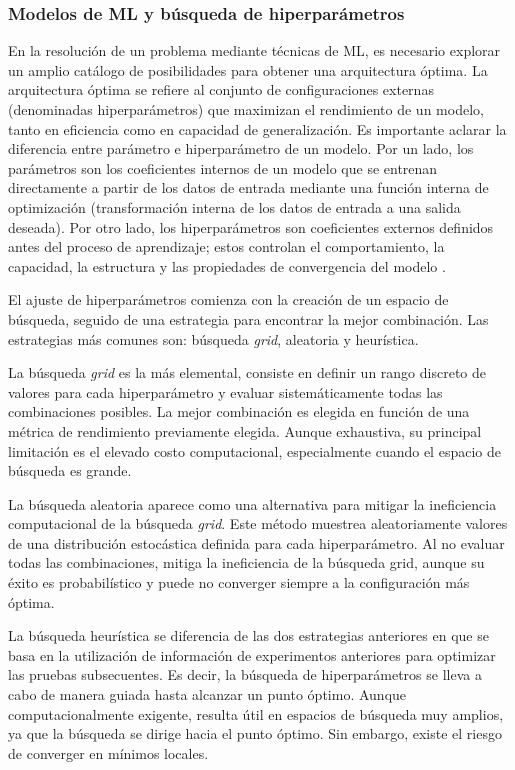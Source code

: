 \subsubsection{Modelos de ML y búsqueda de hiperparámetros}

En la resolución de un problema mediante técnicas de ML, es necesario explorar un amplio catálogo de posibilidades para obtener una arquitectura óptima. La arquitectura óptima se refiere al conjunto de configuraciones externas (denominadas hiperparámetros) que maximizan el rendimiento de un modelo, tanto en eficiencia como en capacidad de generalización. Es importante aclarar la diferencia entre parámetro e hiperparámetro de un modelo. Por un lado, los parámetros son los coeficientes internos de un modelo que se entrenan directamente a partir de los datos de entrada mediante una función interna de optimización (transformación interna de los datos de entrada a una salida deseada). Por otro lado, los hiperparámetros son coeficientes externos definidos antes del proceso de aprendizaje; estos controlan el comportamiento, la capacidad, la estructura y las propiedades de convergencia del modelo \cite{feurer2019hyperparameter}.

El ajuste de hiperparámetros comienza con la creación de un espacio de búsqueda, seguido de una estrategia para encontrar la mejor combinación. Las estrategias más comunes son: búsqueda \textit{grid}, aleatoria y heurística.


La búsqueda \textit{grid} es la más elemental, consiste en definir un rango discreto de valores para cada hiperparámetro y evaluar sistemáticamente todas las combinaciones posibles. La mejor combinación es elegida en función de una métrica de rendimiento previamente elegida. Aunque exhaustiva, su principal limitación es el elevado costo computacional, especialmente cuando el espacio de búsqueda es grande.

La búsqueda aleatoria aparece como una alternativa para mitigar la ineficiencia computacional de la búsqueda \textit{grid}. Este método muestrea aleatoriamente valores de una distribución estocástica definida para cada hiperparámetro. Al no evaluar todas las combinaciones, mitiga la ineficiencia de la búsqueda grid, aunque su éxito es probabilístico y puede no converger siempre a la configuración más óptima.

La búsqueda heurística se diferencia de las dos estrategias anteriores en que se basa en la utilización de información de experimentos anteriores para optimizar las pruebas subsecuentes. Es decir, la búsqueda de hiperparámetros se lleva a cabo de manera guiada hasta alcanzar un punto óptimo. Aunque computacionalmente exigente, resulta útil en espacios de búsqueda muy amplios, ya que la búsqueda se dirige hacia el punto óptimo. Sin embargo, existe el riesgo de converger en mínimos locales.

